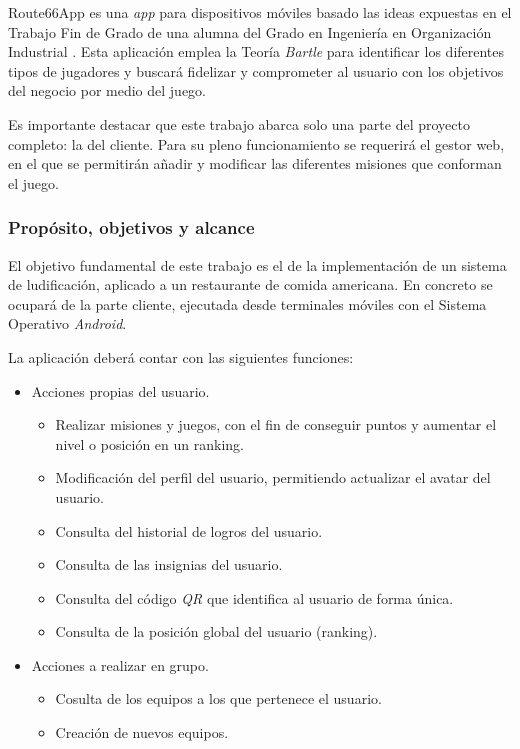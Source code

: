 \documentclass[twoside]{report}
\begin{document}
Route66App es una \textit{app} para dispositivos móviles basado las ideas expuestas en el Trabajo Fin de Grado de una alumna del Grado en Ingeniería en Organización Industrial \cite{cristinatfg}. Esta aplicación emplea la Teoría \textit{Bartle}\cite{iebsctj} para identificar los diferentes tipos de jugadores y buscará fidelizar y comprometer al usuario con los objetivos del negocio por medio del juego.

Es importante destacar que este trabajo abarca solo una parte del proyecto completo: la del cliente. Para su pleno funcionamiento se requerirá el gestor web, en el que se permitirán añadir y modificar las diferentes misiones que conforman el juego. 
 
\subsubsection{Propósito, objetivos y alcance}

El objetivo fundamental de  este trabajo es el de la implementación de un sistema de ludificación, aplicado a un restaurante de comida americana. En concreto se ocupará de la parte cliente, ejecutada desde terminales móviles con el Sistema Operativo \textit{Android}.

La aplicación deberá contar con las siguientes funciones:
\begin{itemize}
\item Acciones propias del usuario.
	\begin{itemize}
	\item Realizar misiones y juegos, con el fin de conseguir puntos y aumentar el nivel o posición en un ranking.
	\item Modificación del perfil del usuario, permitiendo actualizar el avatar del usuario.
	\item Consulta del historial de logros del usuario.
	\item Consulta de las insignias del usuario.
	\item Consulta del código \textit{QR} que identifica al usuario de forma única.
	\item Consulta de la posición global del usuario (ranking).
	\end{itemize}
\item Acciones a realizar en grupo.
	\begin{itemize}
	\item Cosulta de los equipos a los que pertenece el usuario.
	\item Creación de nuevos equipos.
	\end{itemize}
\end{itemize}
\end{document}
